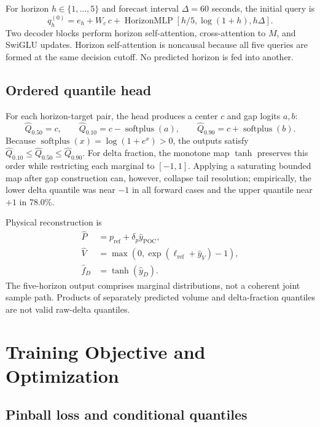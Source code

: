 \documentclass[10pt,letterpaper]{article}
\numberwithin{equation}{section}
\newcommand{\softplus}{\operatorname{softplus}}
\theoremstyle{definition}
\theoremstyle{remark}
\begin{document}
For horizon \(h\in\{1,\ldots,5\}\) and forecast interval \(\Delta=60\) seconds,
the initial query is
\begin{equation}
q_h^{(0)}=e_h+W_c\,c+
\operatorname{HorizonMLP}\!\left[h/5,\log(1+h),h\Delta\right].
\label{eq:horizon-query}
\end{equation}
Two decoder blocks perform horizon self-attention, cross-attention to \(M\),
and SwiGLU updates. Horizon self-attention is noncausal because all five
queries are formed at the same decision cutoff. No predicted horizon is fed
into another.

\subsection{Ordered quantile head}

For each horizon-target pair, the head produces a center \(c\) and gap logits
\(a,b\):
\begin{equation}
\widehat Q_{0.50}=c,\qquad
\widehat Q_{0.10}=c-\softplus(a),\qquad
\widehat Q_{0.90}=c+\softplus(b).
\label{eq:ordered-head}
\end{equation}
Because \(\softplus(x)=\log(1+e^x)>0\), the outputs satisfy
\(\widehat Q_{0.10}\leq\widehat Q_{0.50}\leq\widehat Q_{0.90}\).
For delta fraction, the monotone map \(\tanh\) preserves this order while
restricting each marginal to \([-1,1]\). Applying a saturating bounded map
after gap construction can, however, collapse tail resolution; empirically,
the lower delta quantile was near \(-1\) in all forward cases and the upper
quantile near \(+1\) in 78.0\%.

Physical reconstruction is
\begin{align}
\widehat P&=p_{\mathrm{ref}}+\delta_p\widehat y_{\mathrm{POC}},\nonumber\\
\widehat V&=\max\!\left(0,
\exp(\ell_{\mathrm{ref}}+\widehat y_V)-1\right),\nonumber\\
\widehat f_D&=\tanh(\widehat y_D).
\label{eq:inverse-targets}
\end{align}
The five-horizon output comprises marginal distributions, not a coherent joint
sample path. Products of separately predicted volume and delta-fraction
quantiles are not valid raw-delta quantiles.

\section{Training Objective and Optimization}

\subsection{Pinball loss and conditional quantiles}
\end{document}

